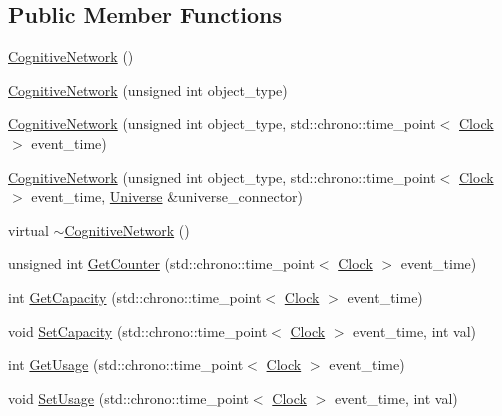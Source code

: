 \subsection*{Public Member Functions}
\begin{DoxyCompactItemize}
\item 
\hyperlink{class_cognitive_network_a3daddb316744336648d317e7f71ed371}{Cognitive\+Network} ()
\item 
\hyperlink{class_cognitive_network_a167b15e33bcbca43cb0a516159e890f2}{Cognitive\+Network} (unsigned int object\+\_\+type)
\item 
\hyperlink{class_cognitive_network_ac7ba285d3468a929dac88756a2c4e4f9}{Cognitive\+Network} (unsigned int object\+\_\+type, std\+::chrono\+::time\+\_\+point$<$ \hyperlink{universe_8h_a0ef8d951d1ca5ab3cfaf7ab4c7a6fd80}{Clock} $>$ event\+\_\+time)
\item 
\hyperlink{class_cognitive_network_a6ec49dcc8cc58cded71983291629179c}{Cognitive\+Network} (unsigned int object\+\_\+type, std\+::chrono\+::time\+\_\+point$<$ \hyperlink{universe_8h_a0ef8d951d1ca5ab3cfaf7ab4c7a6fd80}{Clock} $>$ event\+\_\+time, \hyperlink{class_universe}{Universe} \&universe\+\_\+connector)
\item 
virtual \hyperlink{class_cognitive_network_a17142cc6f0bb3894e63f6c66fa401778}{$\sim$\+Cognitive\+Network} ()
\item 
unsigned int \hyperlink{class_cognitive_network_a160bb447671609eb14b1b8043639ac74}{Get\+Counter} (std\+::chrono\+::time\+\_\+point$<$ \hyperlink{universe_8h_a0ef8d951d1ca5ab3cfaf7ab4c7a6fd80}{Clock} $>$ event\+\_\+time)
\item 
int \hyperlink{class_cognitive_network_a6bb3fc06029c260dd658d0db072625a7}{Get\+Capacity} (std\+::chrono\+::time\+\_\+point$<$ \hyperlink{universe_8h_a0ef8d951d1ca5ab3cfaf7ab4c7a6fd80}{Clock} $>$ event\+\_\+time)
\item 
void \hyperlink{class_cognitive_network_a055b3711835b8d134356298f8975f04d}{Set\+Capacity} (std\+::chrono\+::time\+\_\+point$<$ \hyperlink{universe_8h_a0ef8d951d1ca5ab3cfaf7ab4c7a6fd80}{Clock} $>$ event\+\_\+time, int val)
\item 
int \hyperlink{class_cognitive_network_ad293916cfa0e454ef40d7e228d0dcba3}{Get\+Usage} (std\+::chrono\+::time\+\_\+point$<$ \hyperlink{universe_8h_a0ef8d951d1ca5ab3cfaf7ab4c7a6fd80}{Clock} $>$ event\+\_\+time)
\item 
void \hyperlink{class_cognitive_network_a8b6b4afc47df279604be13bce77f5b0a}{Set\+Usage} (std\+::chrono\+::time\+\_\+point$<$ \hyperlink{universe_8h_a0ef8d951d1ca5ab3cfaf7ab4c7a6fd80}{Clock} $>$ event\+\_\+time, int val)

\end{DoxyCompactItemize}
